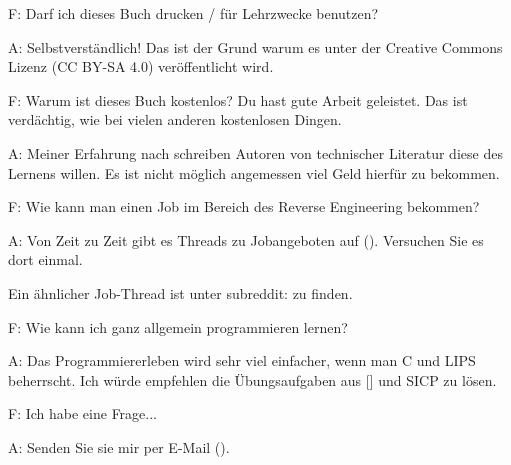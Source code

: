 \par F: Darf ich dieses Buch drucken / für Lehrzwecke benutzen?
\par A: Selbstverständlich! Das ist der Grund warum es unter der Creative Commons Lizenz (CC BY-SA 4.0) veröffentlicht wird.

\par F: Warum ist dieses Buch kostenlos? Du hast gute Arbeit geleistet. Das ist verdächtig, wie bei vielen anderen kostenlosen Dingen.
\par A: Meiner Erfahrung nach schreiben Autoren von technischer Literatur diese des Lernens willen. Es ist nicht möglich angemessen
viel Geld hierfür zu bekommen.

\par F: Wie kann man einen Job im Bereich des Reverse Engineering bekommen?
\par A: Von Zeit zu Zeit gibt es Threads zu Jobangeboten auf \FNURLREDDIT{}
(\RedditHiringThread{}).
Versuchen Sie es dort einmal.

Ein ähnlicher Job-Thread ist unter subreddit: \NetsecHiringThread{} zu finden.

\par F: Wie kann ich ganz allgemein programmieren lernen?
\par A: Das Programmiererleben wird sehr viel einfacher, wenn man C und LIPS beherrscht. Ich würde empfehlen die Übungsaufgaben aus [\KRBook] und \ac{SICP} zu lösen.

\par F: Ich habe eine Frage...
\par A: Senden Sie sie mir per E-Mail (\EMAIL).
